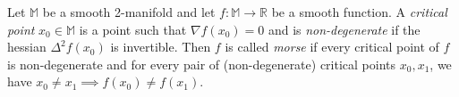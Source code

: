 \documentclass[12pt, fullpage,letterpaper]{article}
\begin{document}
%


Let $\mathbb{M}$ be a smooth 2-manifold and let $f: \mathbb{M} \to \mathbb{R}$ be a smooth function. A \emph{critical point} $x_0 \in \mathbb{M}$ is a point such that $\nabla f(x_0) = 0$ and is \emph{non-degenerate} if the hessian $\Delta^2 f(x_0)$ is invertible. Then $f$ is called \emph{morse} if every critical point of $f$ is non-degenerate and for every pair of (non-degenerate) critical points $x_0, x_1$, we have $x_0 \ne x_1 \implies f(x_0) \ne f(x_1)$. 
\end{document}

